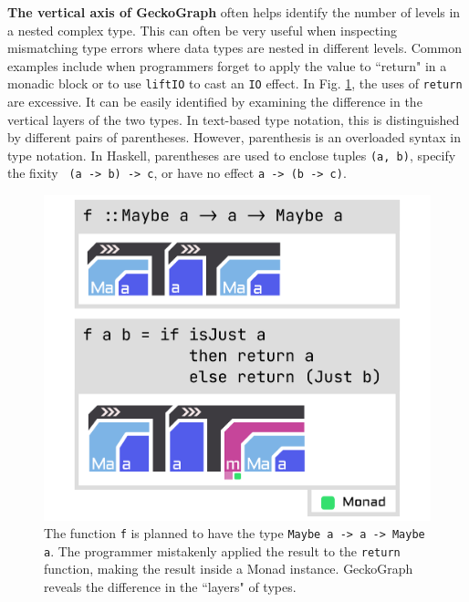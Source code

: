 \documentclass[preprint,12pt]{elsarticle}
\begin{document}
\textbf{The vertical axis of GeckoGraph} often helps identify the number of levels in a nested complex type. This can often be very useful when inspecting mismatching type errors where data types are nested in different levels. Common examples include when programmers forget to apply the value to ``return" in a monadic block or to use \texttt{liftIO} to cast an \texttt{IO} effect. In Fig. \ref{fig:maybe}, the uses of \texttt{return} are excessive. It can be easily identified by examining the difference in the vertical layers of the two types. In text-based type notation, this is distinguished by different pairs of parentheses. However, parenthesis is an overloaded syntax in type notation. In Haskell, parentheses are used to enclose tuples \texttt{(a, b)}, specify the fixity \texttt{ (a -> b) -> c}, or have no effect \texttt{a -> (b -> c)}.

	
\begin{figure}
  \includegraphics[width=0.6\linewidth]{figures/Maybe}
  \caption{\label{fig:maybe} The function \texttt{f} is planned to have the type \texttt{Maybe a -> a -> Maybe a}. The programmer mistakenly applied the result to the \texttt{return} function, making the result inside a Monad instance.  GeckoGraph reveals the difference in the ``layers" of types. }
\end{figure}
\end{document}
